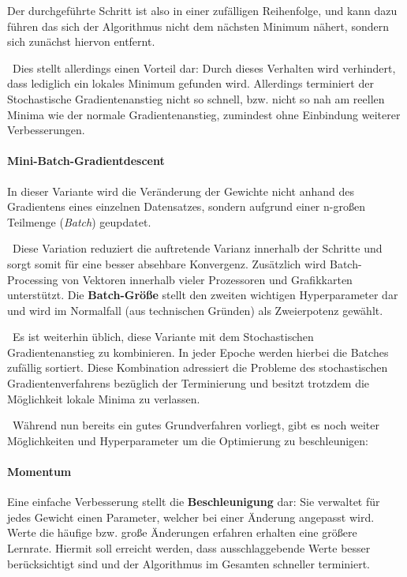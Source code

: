 Der durchgeführte Schritt ist also in einer zufälligen Reihenfolge, und kann dazu führen das sich der Algorithmus nicht dem nächsten Minimum nähert, sondern sich zunächst hiervon entfernt. 

~\newline Dies stellt allerdings einen Vorteil dar: Durch dieses Verhalten wird verhindert, dass lediglich ein lokales Minimum gefunden wird. Allerdings terminiert der Stochastische Gradientenanstieg nicht so schnell, bzw. nicht so nah am reellen Minima wie der normale Gradientenanstieg, zumindest ohne Einbindung weiterer Verbesserungen.

\paragraph{Mini-Batch-Gradientdescent} In dieser Variante wird die Veränderung der Gewichte nicht anhand des Gradientens eines einzelnen Datensatzes, sondern aufgrund einer n-großen Teilmenge (\textit{Batch}) geupdatet. 

~\newline Diese Variation reduziert die auftretende Varianz innerhalb der Schritte und sorgt somit für eine besser absehbare Konvergenz. Zusätzlich wird Batch-Processing von Vektoren innerhalb vieler Prozessoren und Grafikkarten unterstützt. Die \textbf{Batch-Größe} stellt den zweiten wichtigen Hyperparameter dar und wird im Normalfall (aus technischen Gründen) als Zweierpotenz gewählt.   

~\newline Es ist weiterhin üblich, diese Variante mit dem Stochastischen Gradientenanstieg zu kombinieren. In jeder Epoche werden hierbei die Batches zufällig sortiert. Diese Kombination adressiert die Probleme des stochastischen Gradientenverfahrens bezüglich der Terminierung und besitzt trotzdem die Möglichkeit lokale Minima zu verlassen.  

~\newline Während nun bereits ein gutes Grundverfahren vorliegt, gibt es noch weiter Möglichkeiten und Hyperparameter um die Optimierung zu beschleunigen:

\paragraph{Momentum} Eine einfache Verbesserung stellt die \textbf{Beschleunigung} dar: Sie verwaltet für jedes Gewicht einen Parameter, welcher bei einer Änderung angepasst wird. Werte die häufige bzw. große Änderungen erfahren erhalten eine größere Lernrate. Hiermit soll erreicht werden, dass ausschlaggebende Werte besser berücksichtigt sind und der Algorithmus im Gesamten schneller terminiert. 

